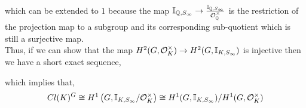 \documentclass[12pt]{extarticle}
\begin{document}
which can be extended to $1$ because the map $\mathbb{I}_{\mathbb{Q}, S_\infty} \to \frac{\mathbb{I}_{\mathbb{Q}, S_\infty}}{\mathcal{O}_{\mathbb{Q}}^\times}$ is the restriction of the projection map to a subgroup and its corresponding sub-quotient which is still a  surjective map. \bigskip \\
Thus, if we can show that the map $H^2(G, \mathcal{O}_{K}^\times) \to H^2(G, \mathbb{I}_{K, S_\infty})$ is injective then we have a short exact sequence, 
\begin{center}
\end{center}
which implies that,
\[ Cl(K)^G \cong H^1\left(G, \mathbb{I}_{K, S_\infty} / \mathcal{O}_{K}^\times \right) \cong H^1(G, \mathbb{I}_{K, S_\infty}) / H^1(G, \mathcal{O}_{K}^\times) \]
\end{document}
